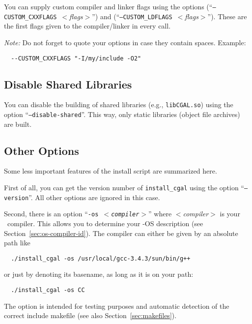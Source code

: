 You can supply custom compiler and linker flags using the options
\mbox{(``\texttt{--CUSTOM\_CXXFLAGS}
  \textit{$<$flags$>$}'')} and
\mbox{(``\texttt{--CUSTOM\_LDFLAGS}
  \textit{$<$flags$>$}'')}. These are the
first flags given to the compiler/linker in every call.

\textit{Note:} Do not forget to quote your options in case they
contain spaces. Example:
\begin{verbatim}
  --CUSTOM_CXXFLAGS "-I/my/include -O2"
\end{verbatim}


\subsection{Disable Shared Libraries\label{sec:disable-shared-setup}}

You can disable the building of shared libraries (e.g.,
\texttt{libCGAL.so}) using the option
\mbox{``\texttt{--disable-shared}''}. This
way, only static libraries (object file archives) are built.

\subsection{Other Options\label{sec:other-options}}

Some less important features of the install script are summarized
here.

First of all, you can get the version number of \texttt{install\_cgal}
using the option ``\texttt{--version}''. All other options are ignored
in this case.

Second, there is an option ``\texttt{-os \textit{$<$compiler$>$}}''
where \textit{$<$compiler$>$} is your \CC\ compiler. This allows you
to determine your \cgal-OS description (see
Section~\ref{sec:os-compiler-id}). The compiler can either be given by
an absolute path like
\begin{verbatim}
  ./install_cgal -os /usr/local/gcc-3.4.3/sun/bin/g++
\end{verbatim}
or just by denoting its basename, as long as it is on your path:
\begin{verbatim}
  ./install_cgal -os CC
\end{verbatim}
The option is intended for testing purposes and automatic detection of
the correct include makefile (see also Section~\ref{sec:makefiles}).


